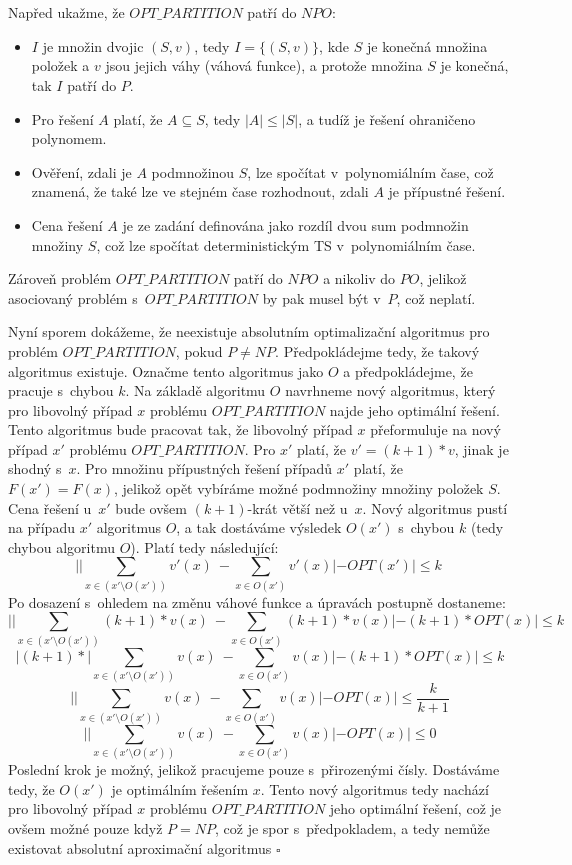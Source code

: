 \documentclass[a4paper]{article}
\newcommand{\prt}{OPT\_PARTITION}
\begin{document}
\pagebreak

\section*{}
Napřed ukažme, že $\prt$ patří do $NPO$:
\begin{itemize}
 \item $I$ je množin dvojic $(S,v)$, tedy $I=\{(S,v)\}$, kde $S$ je konečná množina položek a $v$ jsou jejich váhy (váhová funkce), a protože
  množina $S$ je konečná, tak $I$ patří do $P$.
 \item Pro řešení $A$ platí, že $A\subseteq S$, tedy $|A|\leq |S|$, a tudíž je řešení ohraničeno polynomem.
 \item Ověření, zdali je $A$ podmnožinou $S$, lze spočítat v~polynomiálním čase, což znamená, že také lze ve stejném čase rozhodnout, zdali $A$ je přípustné řešení.
 \item Cena řešení $A$ je ze zadání definována jako rozdíl dvou sum podmnožin množiny $S$,
 což lze spočítat deterministickým TS v~polynomiálním čase.
\end{itemize}
 Zároveň problém $\prt$ patří do $NPO$ a nikoliv do $PO$, jelikož asociovaný problém s~$\prt$ by pak musel být v~$P$, což neplatí.

 Nyní sporem dokážeme, že neexistuje absolutním optimalizační algoritmus pro problém $\prt$, pokud $P \neq NP$.
 Předpokládejme tedy, že takový algoritmus existuje.
 Označme tento algoritmus jako $O$ a předpokládejme, že pracuje s~chybou $k$.
 Na základě algoritmu $O$ navrhneme nový algoritmus, který pro libovolný případ $x$ problému $\prt$ najde jeho optimální řešení.
 Tento algoritmus bude pracovat tak, že libovolný případ $x$ přeformuluje na nový případ $x'$ problému $\prt$.
 Pro $x'$ platí, že $v'=(k+1)*v$, jinak je shodný s~$x$.
 Pro množinu přípustných řešení případů $x'$ platí, že $F(x')=F(x)$, jelikož opět vybíráme možné podmnožiny množiny položek $S$.
 Cena řešení u~$x'$ bude ovšem $(k+1)$-krát větší než u~$x$.
 Nový algoritmus pustí na případu $x'$ algoritmus $O$, a tak dostáváme výsledek $O(x')$ s~chybou $k$ (tedy chybou algoritmu $O$).
 Platí tedy následující:
 $$ ||\sum_{x\in (x'\setminus O(x'))} v'(x)\ - \sum_{x\in O(x')} v'(x)| - OPT(x')| \leq k~$$
 Po dosazení s~ohledem na změnu váhové funkce a úpravách postupně dostaneme:
 $$ ||\sum_{x\in (x'\setminus O(x'))} (k+1)*v(x)\ - \sum_{x\in O(x')} (k+1)*v(x)| - (k+1)*OPT(x)| \leq k$$
 $$ |(k+1)*|\sum_{x\in (x'\setminus O(x'))} v(x)\ - \sum_{x\in O(x')} v(x)| - (k+1)*OPT(x)| \leq k$$
 $$ ||\sum_{x\in (x'\setminus O(x'))} v(x)\ - \sum_{x\in O(x')} v(x)| - OPT(x)| \leq \frac{k}{k+1}$$
 $$ ||\sum_{x\in (x'\setminus O(x'))} v(x)\ - \sum_{x\in O(x')} v(x)| - OPT(x)| \leq 0$$
 Poslední krok je možný, jelikož pracujeme pouze s~přirozenými čísly.
 Dostáváme tedy, že $O(x')$ je optimálním řešením $x$.
 Tento nový algoritmus tedy nachází pro libovolný případ $x$ problému $\prt$ jeho optimální řešení,
 což je ovšem možné pouze když $P=NP$, což je spor s~předpokladem,
 a tedy nemůže existovat absolutní aproximační algoritmus $\square$
\end{document}
